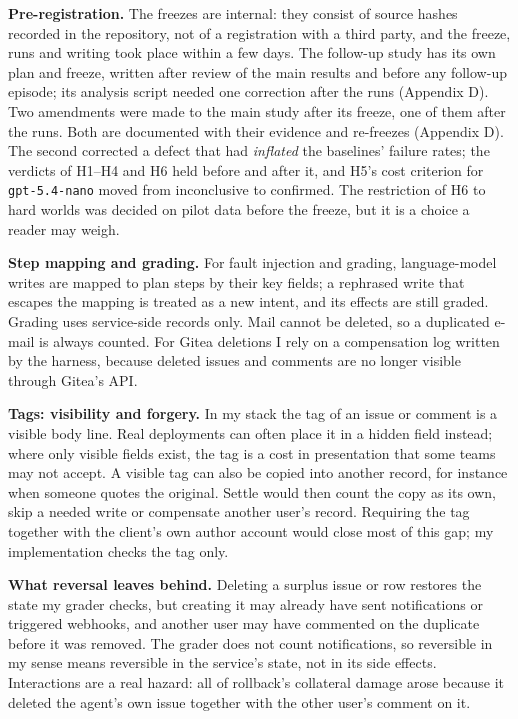 \documentclass[
  10pt,
]{article}
\begin{document}
\textbf{Pre-registration.} The freezes are internal: they consist of
source hashes recorded in the repository, not of a registration with a
third party, and the freeze, runs and writing took place within a few
days. The follow-up study has its own plan and freeze, written after
review of the main results and before any follow-up episode; its
analysis script needed one correction after the runs (Appendix D). Two
amendments were made to the main study after its freeze, one of them
after the runs. Both are documented with their evidence and re-freezes
(Appendix D). The second corrected a defect that had \emph{inflated} the
baselines' failure rates; the verdicts of H1--H4 and H6 held before and
after it, and H5's cost criterion for \texttt{gpt-5.4-nano} moved from
inconclusive to confirmed. The restriction of H6 to hard worlds was
decided on pilot data before the freeze, but it is a choice a reader may
weigh.

\textbf{Step mapping and grading.} For fault injection and grading,
language-model writes are mapped to plan steps by their key fields; a
rephrased write that escapes the mapping is treated as a new intent, and
its effects are still graded. Grading uses service-side records only.
Mail cannot be deleted, so a duplicated e-mail is always counted. For
Gitea deletions I rely on a compensation log written by the harness,
because deleted issues and comments are no longer visible through
Gitea's API.

\textbf{Tags: visibility and forgery.} In my stack the tag of an issue
or comment is a visible body line. Real deployments can often place it
in a hidden field instead; where only visible fields exist, the tag is a
cost in presentation that some teams may not accept. A visible tag can
also be copied into another record, for instance when someone quotes the
original. Settle would then count the copy as its own, skip a needed
write or compensate another user's record. Requiring the tag together
with the client's own author account would close most of this gap; my
implementation checks the tag only.

\textbf{What reversal leaves behind.} Deleting a surplus issue or row
restores the state my grader checks, but creating it may already have
sent notifications or triggered webhooks, and another user may have
commented on the duplicate before it was removed. The grader does not
count notifications, so reversible in my sense means reversible in the
service's state, not in its side effects. Interactions are a real
hazard: all of rollback's collateral damage arose because it deleted the
agent's own issue together with the other user's comment on it.
\end{document}
